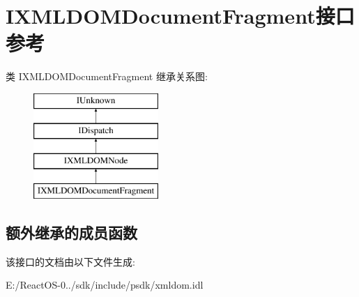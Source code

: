 \hypertarget{interface_i_x_m_l_d_o_m_document_fragment}{}\section{I\+X\+M\+L\+D\+O\+M\+Document\+Fragment接口 参考}
\label{interface_i_x_m_l_d_o_m_document_fragment}
类 I\+X\+M\+L\+D\+O\+M\+Document\+Fragment 继承关系图\+:\begin{figure}[H]
\begin{center}
\leavevmode
\includegraphics[height=4.000000cm]{interface_i_x_m_l_d_o_m_document_fragment}
\end{center}
\end{figure}
\subsection*{额外继承的成员函数}


该接口的文档由以下文件生成\+:\begin{DoxyCompactItemize}
\item 
E\+:/\+React\+O\+S-\/0../sdk/include/psdk/xmldom.\+idl\end{DoxyCompactItemize}
